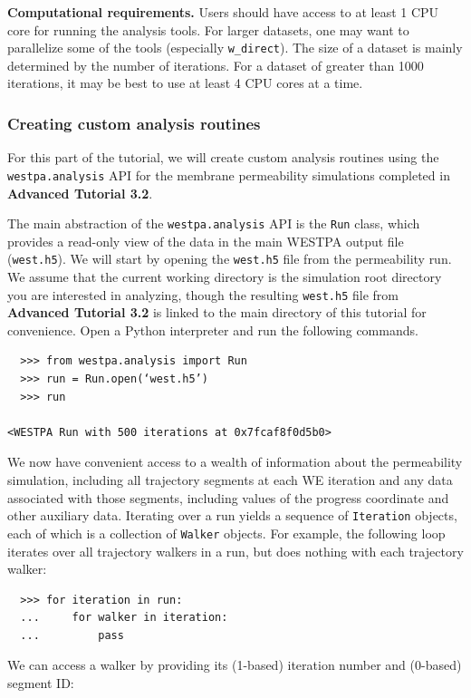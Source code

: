 \textbf{Computational requirements.} Users should have access to at least 1 CPU core for running the analysis tools.
For larger datasets, one may want to parallelize some of the tools (especially \verb|w_direct|).
The size of a dataset is mainly determined by the number of iterations. For a dataset of greater than 1000 iterations, it may be best to use at least 4 CPU cores at a time.

\subsubsection{Creating custom analysis routines}
For this part of the tutorial, we will create custom analysis routines using the \verb|westpa.analysis| API for the membrane permeability simulations completed in \textbf{Advanced Tutorial 3.2}. 

The main abstraction of the \verb|westpa.analysis| API is the \verb|Run| class, which provides a read-only view of the data in the main WESTPA output file (\verb|west.h5|).
We will start by opening the \verb|west.h5| file from the permeability run.
We assume that the current working directory is the simulation root directory you are interested in analyzing, though the resulting \verb|west.h5| file from \textbf{Advanced Tutorial 3.2} is linked to the main directory of this tutorial for convenience.
Open a Python interpreter and run the following commands.

\begin{verbatim}
  >>> from westpa.analysis import Run
  >>> run = Run.open(‘west.h5’)
  >>> run
    
<WESTPA Run with 500 iterations at 0x7fcaf8f0d5b0>
\end{verbatim}

We now have convenient access to a wealth of information about the permeability simulation, including all trajectory segments at each WE iteration and any data associated with those segments, including values of the progress coordinate and other auxiliary data.
Iterating over a run yields a sequence of \verb|Iteration| objects, each of which is a collection of \verb|Walker| objects.
For example, the following loop iterates over all trajectory walkers in a run, but does nothing with each trajectory walker:

\begin{verbatim}
  >>> for iteration in run:
  ...     for walker in iteration:
  ...         pass
\end{verbatim}

We can access a walker by providing its (1-based) iteration number and (0-based) segment ID:

